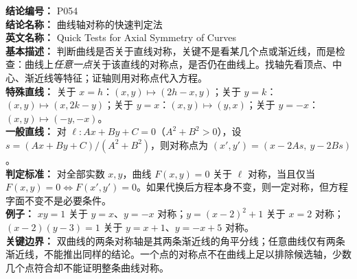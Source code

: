 \textbf{结论编号：} P054\\
\textbf{结论名称：} 曲线轴对称的快速判定法\\
\textbf{英文名称：} Quick Tests for Axial Symmetry of Curves\\
\textbf{基本描述：} 判断曲线是否关于直线对称，关键不是看某几个点或渐近线，而是检查：曲线上\emph{任意一点}关于该直线的对称点，是否仍在曲线上。找轴先看顶点、中心、渐近线等特征；证轴则用对称点代入方程。\\
\textbf{特殊直线：} 关于 $x=h$：$(x,y)\mapsto(2h-x,y)$；关于 $y=k$：$(x,y)\mapsto(x,2k-y)$；关于 $y=x$：$(x,y)\mapsto(y,x)$；关于 $y=-x$：$(x,y)\mapsto(-y,-x)$。\\
\textbf{一般直线：} 对 $\ell:Ax+By+C=0$（$A^2+B^2>0$），设 $s=(Ax+By+C)/(A^2+B^2)$，则对称点为 $\boxed{(x',y')=(x-2As,\ y-2Bs)}$。\\
\textbf{判定标准：} 对全部实数 $x,y$，曲线 $F(x,y)=0$ 关于 $\ell$ 对称，当且仅当 $F(x,y)=0\Longleftrightarrow F(x',y')=0$。如果代换后方程本身不变，则一定对称，但方程字面不变不是必要条件。\\
\textbf{例子：} $xy=1$ 关于 $y=x$、$y=-x$ 对称；$y=(x-2)^2+1$ 关于 $x=2$ 对称；$(x-2)(y-3)=1$ 关于 $y=x+1$、$y=-x+5$ 对称。\\
\textbf{关键边界：} 双曲线的两条对称轴是其两条渐近线的角平分线；任意曲线仅有两条渐近线，不能推出同样的结论。一个点的对称点不在曲线上足以排除候选轴，少数几个点符合却不能证明整条曲线对称。
